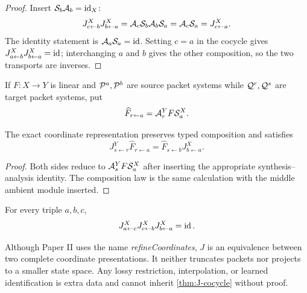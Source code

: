\begin{proof}
Insert $\mathcal S_b\mathcal A_b=\operatorname{id}_X$:
\[
J^X_{c\leftarrow b}J^X_{b\leftarrow a}
=\mathcal A_c\mathcal S_b\mathcal A_b\mathcal S_a
=\mathcal A_c\mathcal S_a
=J^X_{c\leftarrow a}.
\]
The identity statement is $\mathcal A_a\mathcal S_a=\operatorname{id}$.  Setting $c=a$ in the cocycle
gives $J^X_{a\leftarrow b}J^X_{b\leftarrow a}=\operatorname{id}$; interchanging $a$ and $b$
gives the other composition, so the two transports are inverses.
\end{proof}

If $F:X\to Y$ is linear and $\mathcal P^a,\mathcal P^b$ are source packet systems while
$\mathcal Q^r,\mathcal Q^s$ are target packet systems, put
\[
\widehat F_{r\leftarrow a}
=
\mathcal A^Y_rF\mathcal S^X_a.
\]

\begin{theorem}
\label{thm:canonical-naturality}
The exact coordinate representation preserves typed composition and satisfies
\[
J^Y_{s\leftarrow r}\widehat F_{r\leftarrow a}
=
\widehat F_{s\leftarrow b}J^X_{b\leftarrow a}.
\]
\end{theorem}

\begin{proof}
Both sides reduce to $\mathcal A^Y_sF\mathcal S^X_a$ after inserting the appropriate
synthesis--analysis identity.  The composition law is the same calculation
with the middle ambient module inserted.
\end{proof}

\begin{corollary}
\label{cor:J-flat}
For every triple $a,b,c$,
\[
J^X_{a\leftarrow c}J^X_{c\leftarrow b}J^X_{b\leftarrow a}=\operatorname{id}.
\]
\end{corollary}

\begin{boundary}
Although Paper II uses the name \emph{refineCoordinates}, $J$ is an
equivalence between two complete coordinate presentations.  It neither
truncates packets nor projects to a smaller state space.  Any lossy
restriction, interpolation, or learned identification is extra data and
cannot inherit \cref{thm:J-cocycle} without proof.
\end{boundary}

